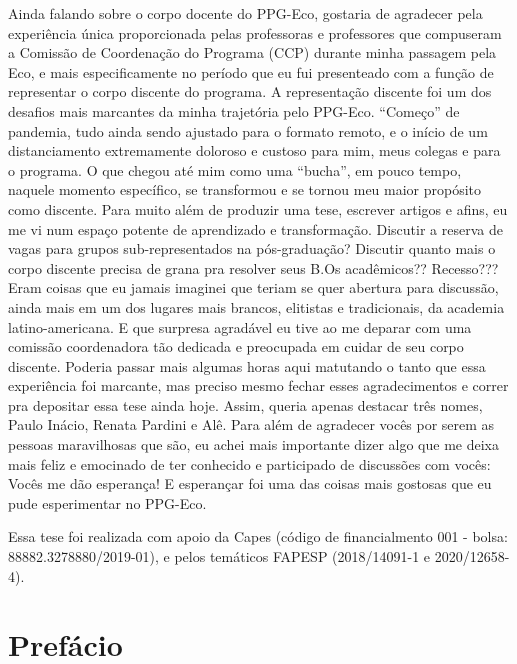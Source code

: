 \documentclass[12pt,openright,oneside,a4paper,english]{abntex2}
\begin{document}
\begin{agradecimentos}[Agradecimentos]
Ainda falando sobre o corpo docente do PPG-Eco, gostaria de agradecer pela experiência única proporcionada pelas professoras e professores que compuseram a Comissão de Coordenação do Programa (CCP) durante minha passagem pela Eco, e mais especificamente no período que eu fui presenteado com a função de representar o corpo discente do programa. A representação discente foi um dos desafios mais marcantes da minha trajetória pelo PPG-Eco. “Começo” de pandemia, tudo ainda sendo ajustado para o formato remoto, e o início de um distanciamento extremamente doloroso e custoso para mim, meus colegas e para o programa. O que chegou até mim como uma “bucha”, em pouco tempo, naquele momento específico, se transformou e se tornou meu maior propósito como discente. Para muito além de produzir uma tese, escrever artigos e afins, eu me vi num espaço potente de aprendizado e transformação. Discutir a reserva de vagas para grupos sub-representados na pós-graduação? Discutir quanto mais o corpo discente precisa de grana pra resolver seus B.Os acadêmicos?? Recesso??? Eram coisas que eu jamais imaginei que teriam se quer abertura para discussão, ainda mais em um dos lugares mais brancos, elitistas e tradicionais, da academia latino-americana. E que surpresa agradável eu tive ao me deparar com uma comissão coordenadora tão dedicada e preocupada em cuidar de seu corpo discente. Poderia passar mais algumas horas aqui matutando o tanto que essa experiência foi marcante, mas preciso mesmo fechar esses agradecimentos e correr pra depositar essa tese ainda hoje. Assim, queria apenas destacar três nomes, Paulo Inácio, Renata Pardini e Alê. Para além de agradecer vocês por serem as pessoas maravilhosas que são, eu achei mais importante dizer algo que me deixa mais feliz e emocinado de ter conhecido e participado de discussões com vocês: Vocês me dão esperança! E esperançar foi uma das coisas mais gostosas que eu pude esperimentar no PPG-Eco.

Essa tese foi realizada com apoio da Capes (código de financialmento 001 - bolsa: 88882.3278880/2019-01), e pelos temáticos FAPESP (2018/14091-1 e 2020/12658-4).

\end{agradecimentos}

\chapter*[Prefácio]{Prefácio}
\end{document}

